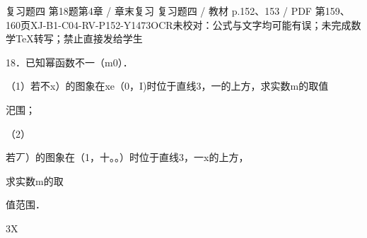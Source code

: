 \begin{bankitem}{复习题四 第18题}{第4章 / 章末复习 复习题四 / 教材 p.152、153 / PDF 第159、160页}{XJ-B1-C04-RV-P152-Y1473}{OCR未校对：公式与文字均可能有误；未完成数学TeX转写；禁止直接发给学生}
\begin{ocrdraft}
\par
18．已知幂函数不一（m0）．
\par
（1）若不x）的图象在xe（0，I)时位于直线3，一的上方，求实数m的取值
\par
汜围；
\par
[教材p.153 / PDF第160页]
\par
（2）
\par
若丆）的图象在（1，十。。）时位于直线3，一x的上方，
\par
求实数m的取
\par
值范围．
\par
3X
\end{ocrdraft}
\end{bankitem}

